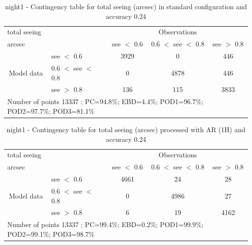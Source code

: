\begin{table}[p!]
\begin{center}
\begin{tabular}{llccc}
\hline
{total seeing}                                       &                                                    & \multicolumn{3}{c}{Observations}                 \\
{arcsec}                                       &                             & see $<$ 0.6   & 0.6 $<$ see $<$ 0.8 & see $>$ 0.8 \\
\hline
\multicolumn{1}{c}{\multirow{3}{*}{Model data}}  & see $<$ 0.6             & 3929                & 0                       & 446              \\
                                                 & 0.6  $<$ see $<$ 0.8 & 0                & 4878                       & 446              \\
                                                 & see $>$ 0.8             & 136                & 115                       & 3833              \\
\hline
\multicolumn{5}{l}{ Number of points        13337 ; PC=94.8\%; EBD=4.4\%; POD1=96.7\%; POD2=97.7\%; POD3=81.1\%}
\end{tabular}
\end{center}
\caption{night1 - Contingency table for  total seeing (arcsec) in standard configuration and accuracy 0.24}
\label{tab:contingencyseeBEF:night1}
\end{table}
\begin{table}[p!]
\begin{center}
\begin{tabular}{llccc}
\hline
{total seeing}                                       &                                                    & \multicolumn{3}{c}{Observations}                 \\
{arcsec}                                       &                             & see $<$ 0.6   & 0.6 $<$ see $<$ 0.8 & see $>$ 0.8 \\
\hline
\multicolumn{1}{c}{\multirow{3}{*}{Model data}}  & see $<$ 0.6             & 4661                & 24                       & 28              \\
                                                 & 0.6  $<$ see $<$ 0.8 & 0                & 4986                       & 27              \\
                                                 & see $>$ 0.8             & 6                & 19                       & 4162              \\
\hline
\multicolumn{5}{l}{ Number of points        13337 ; PC=99.4\%; EBD=0.2\%; POD1=99.9\%; POD2=99.1\%; POD3=98.7\%}
\end{tabular}
\end{center}
\caption{night1 - Contingency table for  total seeing (arcsec) processed with AR (1H) and accuracy 0.24}
\label{tab:contingencyseeAFT:night1}
\end{table}

